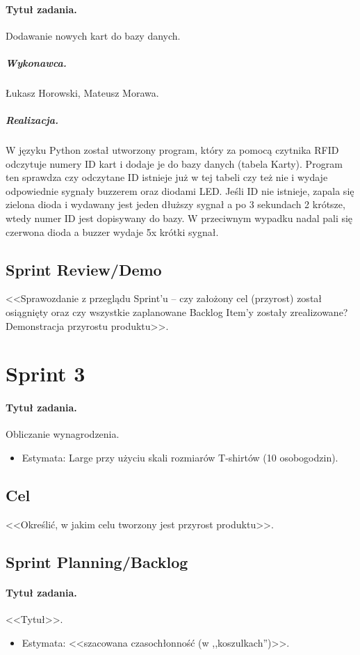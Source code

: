 \documentclass[a4paper]{article}
\begin{document}
\paragraph{Tytuł zadania.} Dodawanie nowych kart do bazy danych.
\subparagraph{Wykonawca.} Łukasz Horowski, Mateusz Morawa.
\subparagraph{Realizacja.} W języku Python został utworzony program, który za pomocą czytnika RFID odczytuje numery ID kart i dodaje je do bazy danych (tabela Karty). Program ten sprawdza czy odczytane ID istnieje już w tej tabeli czy też nie i wydaje odpowiednie sygnały buzzerem oraz diodami LED. Jeśli ID nie istnieje, zapala się zielona dioda i wydawany jest jeden dłuższy sygnał a po 3 sekundach 2 krótsze, wtedy numer ID jest dopisywany do bazy. W przeciwnym wypadku nadal pali się czerwona dioda a buzzer wydaje 5x krótki sygnał.




\subsection{Sprint Review/Demo}
<<Sprawozdanie z przeglądu Sprint'u -- czy założony cel (przyrost) został osiągnięty oraz czy wszystkie zaplanowane Backlog Item'y zostały zrealizowane? Demonstracja przyrostu produktu>>.

\section{Sprint 3}

\paragraph{Tytuł zadania.} Obliczanie wynagrodzenia.
\begin{itemize}
\item Estymata: Large przy użyciu skali rozmiarów T-shirtów (10 osobogodzin).
\end{itemize}

\subsection{Cel} <<Określić, w jakim celu tworzony jest przyrost produktu>>.

\subsection{Sprint Planning/Backlog}

\paragraph{Tytuł zadania.} <<Tytuł>>.
\begin{itemize}
	\item Estymata: <<szacowana czasochłonność (w ,,koszulkach'')>>.
\end{itemize}
\end{document}
